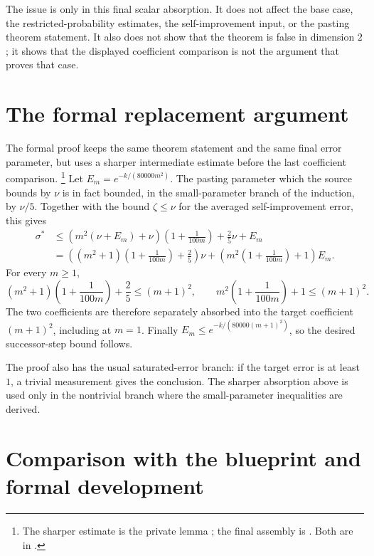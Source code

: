 \documentclass[11pt]{article}
\begin{document}
The issue is only in this final scalar absorption. It does not affect the base
case, the restricted-probability estimates, the self-improvement input, or the
pasting theorem statement. It also does not show that the theorem is false in
dimension $2$; it shows that the displayed coefficient comparison is not the
argument that proves that case.

\section{The formal replacement argument}

The formal proof keeps the same theorem statement and the same final error
parameter, but uses a sharper intermediate estimate before the last coefficient
comparison.%
\footnote{The sharper estimate is the private lemma
; the final assembly is
. Both are in
.}
Let $E_m=e^{-k/(80000m^2)}$. The pasting parameter which the source bounds by
$\nu$ is in fact bounded, in the small-parameter branch of the induction, by
$\nu/5$. Together with the bound $\zeta\le\nu$ for the averaged
self-improvement error, this gives
\begin{align*}
  \sigma^*
  &\le
  \left(m^2(\nu+E_m)+\nu\right)
  \left(1+\frac{1}{100m}\right)
  +\frac{2}{5}\nu+E_m \\
  &=
  \left((m^2+1)\left(1+\frac{1}{100m}\right)+\frac{2}{5}\right)\nu
  +
  \left(m^2\left(1+\frac{1}{100m}\right)+1\right)E_m.
\end{align*}
For every $m\ge 1$,
\[
  (m^2+1)\left(1+\frac{1}{100m}\right)+\frac{2}{5}
  \le (m+1)^2,
  \qquad
  m^2\left(1+\frac{1}{100m}\right)+1
  \le (m+1)^2.
\]
The two coefficients are therefore separately absorbed into the target
coefficient $(m+1)^2$, including at $m=1$. Finally
$E_m\le e^{-k/(80000(m+1)^2)}$, so the desired successor-step bound follows.

The proof also has the usual saturated-error branch: if the target error is at
least $1$, a trivial measurement gives the conclusion. The sharper absorption
above is used only in the nontrivial branch where the small-parameter
inequalities are derived.

\section{Comparison with the blueprint and formal development}
\end{document}
